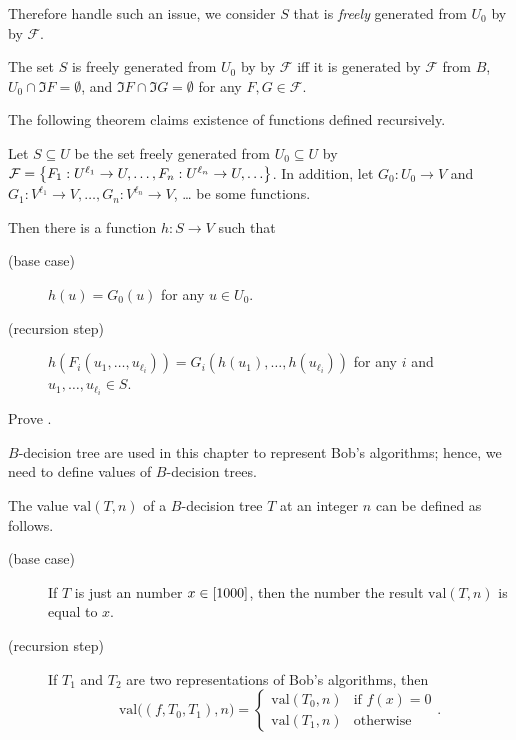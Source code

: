 Therefore handle such an issue, we consider $S$ that is \emph{freely} generated
from $U_0$ by by $\mathcal{F}$.
\begin{definition}
  The set $S$ is freely generated from $U_0$ by by $\mathcal{F}$ iff it is
  generated by $\mathcal{F}$ from $B$,
  $U_0 \cap \Im F = \emptyset$, and $\Im F \cap \Im G = \emptyset$ for any
  $F, G \in \mathcal{F}$.
\end{definition}

The following theorem claims existence of functions defined recursively.
\begin{theorem}
\label{theorem:recursion-principle}
    Let $S \subseteq U$ be the set freely generated from $U_0 \subseteq U$ by
    $\mathcal{F} =
      \set{F_1 : U^{\ell_1} \to U, \dots, F_n : U^{\ell_n} \to U, \dots}$.
    In addition, let $G_0 : U_0 \to V$ and
    $G_1 : V^{\ell_1} \to V, \dots, G_n : V^{\ell_n} \to V$, \dots
    be some functions.

    Then there is a function $h : S \to V$ such that
    \begin{description}
        \item [(base case)] $h(u) = G_0(u)$ for any $u \in U_0$.
        \item[(recursion step)] $h(F_i(u_1, \dots, u_{\ell_i})) =
            G_i(h(u_1), \dots, h(u_{\ell_i}))$ for any $i$ and
            $u_1, \dots, u_{\ell_i} \in S$.
    \end{description}
\end{theorem}

\begin{exercise}
    Prove .
\end{exercise}

$B$-decision tree are used in this chapter to represent Bob's algorithms;
hence, we need to define values of $B$-decision trees.
\begin{definition}
  The value
  $\mathrm{val}(T, n)$ of a $B$-decision tree $T$ at an integer $n$ can
  be defined as follows.
  \begin{description}
      \item [(base case)] If $T$ is just an number $x \in {[{1000}]}$,
        then the number the result $\mathrm{val}(T, n)$ is equal to $x$.
      \item[(recursion step)] If $T_1$ and $T_2$ are two representations of
        Bob's algorithms, then
        \[
          \mathrm{val}\big((f, T_0, T_1), n\big) =
          \begin{cases}
            \mathrm{val}(T_0, n) & \text{if } f(x) = 0 \\
            \mathrm{val}(T_1, n) & \text{otherwise}
          \end{cases}.
        \]
  \end{description}
\end{definition}

